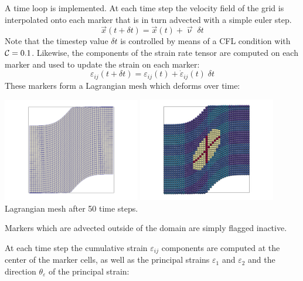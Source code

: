 A time loop is implemented. At each time step the velocity field of the grid is 
interpolated onto each marker that is in turn advected with a simple euler step. 
\[
\vec{x}(t+\delta t) = \vec{x}(t) + \vec\upnu \; \delta t
\]
Note that the timestep value $\delta t$ is controlled by means of a CFL condition 
with ${\cal C}=0.1$. Likewise, the components of the strain rate tensor are computed on each marker and 
used to update the strain on each marker:
\[
\varepsilon_{ij}(t+\delta t) = \varepsilon_{ij}(t) + \dot\varepsilon_{ij}(t) \; \delta t
\]
These markers form a Lagrangian mesh which deforms over time:
\begin{center}
\includegraphics[width=6cm]{python_codes/fieldstone_89/results/shearband/init/swarm_mesh}
\includegraphics[width=6cm]{python_codes/fieldstone_89/results/shearband/init/swarm_paint}\\
{\captionfont Lagrangian mesh after 50 time steps.}
\end{center}
Markers which are advected outside of the domain are simply flagged inactive. 

At each time step the cumulative strain $\varepsilon_{ij}$ components are
computed at the center of the marker cells, as well as the principal strains $\varepsilon_1$ 
and $\varepsilon_2$ and the direction $\theta_\varepsilon$ of the principal strain:

